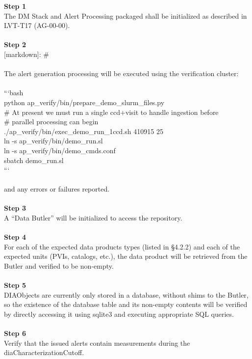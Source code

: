\textbf{Step 1}\\
The DM Stack and Alert Processing packaged shall be initialized as
described in LVT-T17 (AG-00-00).\\
~\\
\textbf{Step 2}\\
{[}markdown{]}: \#\\
~\\
The alert generation processing will be executed using the verification
cluster:\\
~\\
```bash\\
python ap\_verify/bin/prepare\_demo\_slurm\_files.py\\
\# At present we must run a single ccd+visit to handle ingestion
before\\
\# parallel processing can begin\\
./ap\_verify/bin/exec\_demo\_run\_1ccd.sh 410915 25\\
ln -s ap\_verify/bin/demo\_run.sl\\
ln -s ap\_verify/bin/demo\_cmds.conf\\
sbatch demo\_run.sl\\
```\\
~\\
and any errors or failures reported.\\
~\\
\textbf{Step 3}\\
A ``Data Butler'' will be initialized to access the repository.\\
~\\
\textbf{Step 4}\\
For each of the expected data products types (listed in §4.2.2) and each
of the expected units (PVIs, catalogs, etc.), the data product will be
retrieved from the Butler and verified to be non-empty.\\
~\\
\textbf{Step 5}\\
DIAObjects are currently only stored in a database, without shims to the
Butler, so the existence of the database table and its non-empty
contents will be verified by directly accessing it using sqlite3 and
executing appropriate SQL queries.\\
~\\
\textbf{Step 6}\\
Verify that the issued alerts contain measurements during the
diaCharacterizationCutoff.\\
~\\

